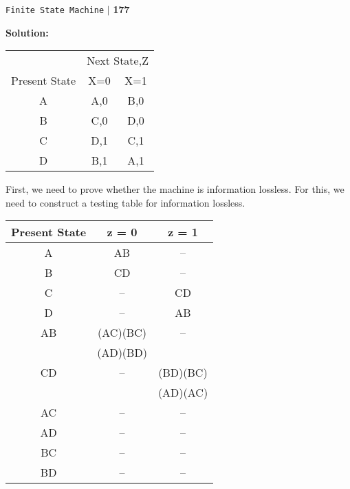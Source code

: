 \documentclass[a4]{article}
\begin{document}
\begin{flushright}
\texttt{Finite State Machine} \hspace*{0.1cm}\textbf{$|$} \hspace*{0.1cm} \textbf{177}\hspace*{0.1cm}
\end{flushright}
\vspace*{1cm}

\large{\textbf{Solution:}}


\begin{center}
\begin{tabular}{ccc}
 \hline

 \hline

 \hline

 \hline
 & \multicolumn{2}{c}{Next State,Z}\\
 \cline{2-3}
Present State & X=0           &   X=1\\
\hline
    A    &  A,0  & B,0 \\
    B    &  C,0  & D,0 \\
    C    &  D,1  & C,1 \\
    D    &  B,1  & A,1 \\
 \hline

 \hline

 \hline

 \hline
\end{tabular}
\end{center}


First, we need to prove whether the machine is information lossless. For this, we need to construct a testing table for information lossless.


\begin{center}
  \begin{tabular}{ccc}
\hline

\hline

\hline

\hline
Present State & z = 0 & z = 1\\
\hline
 A &     AB    &     --      \\
 B &     CD    &     --      \\
 C &     --    &     CD      \\
 D &     --    &     AB      \\
\hline
AB & (AC)(BC)  &     --      \\
   & (AD)(BD)  &             \\
CD &   --      &  (BD)(BC)   \\
   &           &  (AD)(AC)   \\
AC &   --      &     --      \\
AD &   --      &     --      \\
BC &   --      &     --      \\
BD &   --      &     --      \\
\hline

\hline

\hline

\hline

  \end{tabular}
\end{center}
\end{document}
